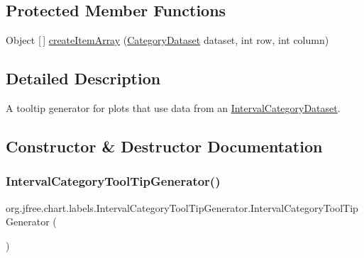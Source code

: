 \subsection*{Protected Member Functions}
\begin{DoxyCompactItemize}
\item 
Object \mbox{[}$\,$\mbox{]} \mbox{\hyperlink{classorg_1_1jfree_1_1chart_1_1labels_1_1_interval_category_tool_tip_generator_a09a1579e16222ed22ff71760146e79c1}{create\+Item\+Array}} (\mbox{\hyperlink{interfaceorg_1_1jfree_1_1data_1_1category_1_1_category_dataset}{Category\+Dataset}} dataset, int row, int column)
\end{DoxyCompactItemize}


\subsection{Detailed Description}
A tooltip generator for plots that use data from an \mbox{\hyperlink{}{Interval\+Category\+Dataset}}. 

\subsection{Constructor \& Destructor Documentation}
\mbox{\label{classorg_1_1jfree_1_1chart_1_1labels_1_1_interval_category_tool_tip_generator_ad30e46e6c74820e6396ea2490b6bf63f}} 
\subsubsection{\texorpdfstring{Interval\+Category\+Tool\+Tip\+Generator()}{IntervalCategoryToolTipGenerator()}\hspace{0.1cm}{\footnotesize\ttfamily [1/3]}}
{\footnotesize\ttfamily org.\+jfree.\+chart.\+labels.\+Interval\+Category\+Tool\+Tip\+Generator.\+Interval\+Category\+Tool\+Tip\+Generator (\begin{DoxyParamCaption}{ }\end{DoxyParamCaption})}

